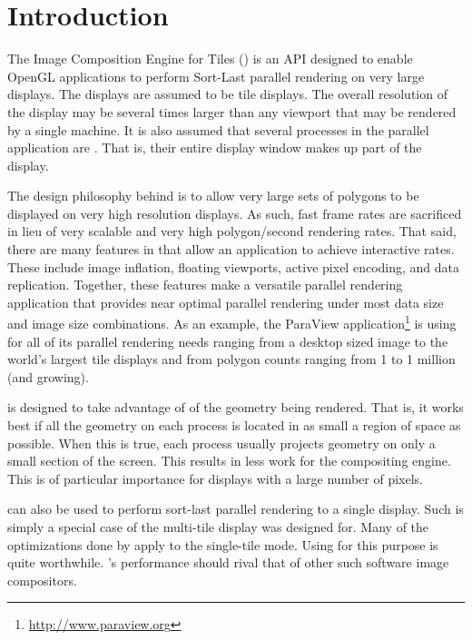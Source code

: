 

\chapter{Introduction}
\label{chap:Introduction}

The Image Composition Engine for Tiles (\IceT) is an API designed to enable
OpenGL applications to perform Sort-Last parallel rendering on very large
displays.  The displays are assumed to be tile displays.  The overall
resolution of the display may be several times larger than any viewport
that may be rendered by a single machine.  It is also assumed that several
processes in the parallel application are
.  That is, their entire
display window makes up part of the display.

The design philosophy behind \IceT is to allow very large sets of polygons
to be displayed on very high resolution displays.  As such, fast frame
rates are sacrificed in lieu of very scalable and very high polygon/second
rendering rates.  That said, there are many features in \IceT that allow an
application to achieve interactive rates.  These include image inflation,
floating viewports, active pixel encoding, and data replication.  Together,
these features make \IceT a versatile parallel rendering application that
provides near optimal parallel rendering under most data size and image
size combinations.  As an example, the ParaView
application\footnote{\href{http://www.paraview.org}{http://www.paraview.org}}
is using \IceT for all of its parallel rendering needs ranging from a
desktop sized image to the world's largest tile displays and from polygon
counts ranging from 1 to 1 million (and growing).

\IceT is designed to take advantage of
 of the
geometry being rendered.  That is, it works best if all the geometry on
each process is located in as small a region of space as possible.  When
this is true, each process usually projects geometry on only a small
section of the screen.  This results in less work for the compositing
engine.  This is of particular importance for displays with a large number
of pixels.

\IceT can also be used to perform sort-last parallel rendering to a single
display.  Such 
is simply a special case of the multi-tile display \IceT was designed for.
Many of the optimizations done by \IceT apply to the single-tile mode.
Using \IceT for this purpose is quite worthwhile.  \IceT's performance
should rival that of other such software image compositors.

